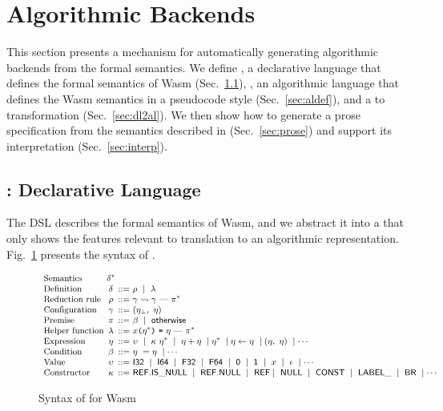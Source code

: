 \section{Algorithmic Backends}\label{sec:al}
This section presents a mechanism for automatically generating
algorithmic backends from the formal semantics.
We define \emph{\dl}, a declarative language that defines the formal
semantics of Wasm (Sec.~\ref{sec:dl}),
\emph{\al}, an algorithmic language that defines the Wasm semantics
in a pseudocode style (Sec.~\ref{sec:aldef}),
and a \dl to \al transformation (Sec.~\ref{sec:dl2al}).
We then show how to generate a prose specification from the semantics
described in \al (Sec.~\ref{sec:prose}) and
support its interpretation (Sec.~\ref{sec:interp}).

\subsection{\dl: Declarative Language}\label{sec:dl}
The DSL describes the formal semantics of Wasm, and
we abstract it into a \dl that only shows the features relevant to translation to an algorithmic representation.
Fig.~\ref{fig:dl-syntax} presents the syntax of \dl.

\begin{figure}[t]
\[
\small
\begin{array}{l@{~}c@{~}r@{~}l}
\text{Semantics} & \delta^*\\
\text{Definition} & \delta &::=& \rho\ \mid\ \lambda\\
\text{Reduction rule} & \rho &::=& \gamma \leadsto \gamma\ \mbox{---}\ \pi^*\\
\text{Configuration} & \gamma &::=&(\eta_\bot,\ \eta)\\
\text{Premise} & \pi &::=& \beta\ \mid\ \mathsf{\small otherwise}\\
\text{Helper function} &
\lambda &::=& \varx \kwrl \eta^* \kwrr\ \kwequ\ \eta\ \mbox{---}\ \pi^*\\
\text{Expression} & \eta &::=& \upsilon\ \mid\ \kappa\ \eta^*\ \mid\ \eta + \eta\
\mid \eta^*\ \mid \eta \leftarrow \eta \ \mid (\eta,\ \eta)\
\mid \cdots \\
\text{Condition} & \beta  &::=& \eta\ = \eta\ \mid \cdots\\
\text{Value} & \upsilon &::=& \ssf{I32}\ \mid\ \ssf{I64}\ \mid\ 
\ssf{F32}\ \mid\ \ssf{F64}\ \mid\ 
\ssf{0}\ \mid\ \ssf{1}\ \mid\ x\ \mid\ \epsilon\ \mid \cdots \\
\text{Constructor} & \kappa &::=& \ssf{REF.IS\_NULL}\ \mid\ \ssf{REF.NULL}\
\mid\ \ssf{REF} \mid\ \ssf{NULL}\ \mid\ \ssf{CONST}\ \mid\ \ssf{LABEL\_}\
\mid\ \ssf{BR}\
\mid \cdots
\end{array}
\]
\caption{Syntax of \dl for Wasm}\label{fig:dl-syntax}
\end{figure}

